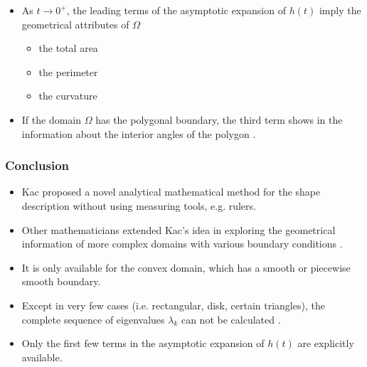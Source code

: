      \begin{itemize} 
        \item As $t \rightarrow 0^{+}$, the leading terms of the asymptotic expansion of $h(t)$ imply the geometrical attributes of $\Omega$
          \begin{itemize}
            \item the total area
            \item the perimeter
            \item the curvature
          \end{itemize}
          
        \item If the domain $\Omega$ has the polygonal boundary, the third term shows in the information about the interior angles of the polygon \cite{grieser2013hearing}.
      \end{itemize}
      

   \subsubsection{Conclusion}


        \begin{itemize}
          \item Kac proposed a novel analytical mathematical method for the shape description without using measuring tools, e.g. rulers.
          \item Other mathematicians extended Kac's idea in exploring the geometrical information of more complex domains with various boundary conditions \cite{khabou2007shape}\cite{gottlieb1985eigenvalues}\cite{gottlieb1983hearing} \cite{zayed1989heat}\cite{sleeman1984trace}.
        \end{itemize}
        
        
        \begin{itemize}
          \item It is only available for the convex domain, which has a smooth or piecewise smooth boundary.  
          \item Except in very few cases (i.e. rectangular, disk, certain triangles), the complete sequence of eigenvalues $\lambda_k$ can not be calculated \cite{grieser2013hearing}.
          \item Only the first few terms in the asymptotic expansion of $h(t)$ are explicitly available.
        \end{itemize}


